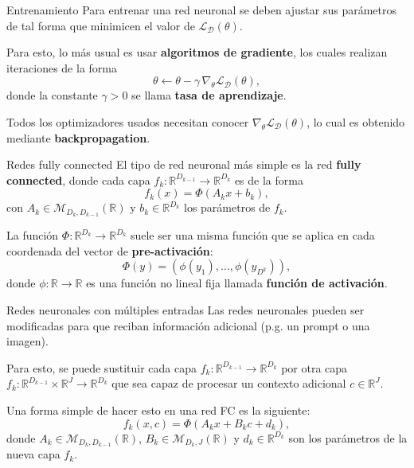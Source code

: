 \documentclass{beamer}
\newcommand{\R}{\mathbb{R}}
\begin{document}
\begin{frame}{Entrenamiento}
    Para entrenar una red neuronal se deben ajustar sus parámetros de tal forma que minimicen el valor de $\mathcal{L}_\mathcal{D}\left(\theta\right)$.

    Para esto, lo más usual es usar \textbf{algoritmos de gradiente}, los cuales realizan iteraciones de la forma
    \begin{equation*}
        \theta\leftarrow\theta - \gamma\,\nabla_{\theta} \mathcal{L}_\mathcal{D}\left(\theta\right),
    \end{equation*}
    donde la constante $\gamma>0$ se llama \textbf{tasa de aprendizaje}.

    Todos los optimizadores usados necesitan conocer $\nabla_\theta \mathcal{L}_\mathcal{D}\left(\theta\right)$, lo cual es obtenido mediante \textbf{backpropagation}.
\end{frame}

\begin{frame}{Redes fully connected}
    El tipo de red neuronal más simple es la red \textbf{fully connected}, donde cada capa $f_k:\R^{D_{k-1}}\to\R^{D_k}$ es de la forma
    \begin{equation*}
        f_k(x)=\Phi(A_kx+b_k),
    \end{equation*}
    con $A_k\in\mathcal{M}_{D_k,D_{k-1}}(\R)$ y $b_k\in\R^{D_k}$ los parámetros de $f_k$.

    La función $\Phi:\R^{D_k}\to\R^{D_k}$ suele ser una misma función que se aplica en cada coordenada del vector de \textbf{pre-activación}:
    \begin{equation*}
        \Phi(y)=\left(\phi(y_1),\ldots,\phi(y_{D^k})\right),
    \end{equation*}
    donde $\phi:\R\to\R$ es una función no lineal fija llamada \textbf{función de activación}.
\end{frame}

\begin{frame}{Redes neuronales con múltiples entradas}
    Las redes neuronales pueden ser modificadas para que reciban información adicional (p.g. un prompt o una imagen).

    Para esto, se puede sustituir cada capa $f_k:\R^{D_{k-1}}\to\R^{D_k}$ por otra capa $f_k:\R^{D_{k-1}}\times\R^J\to\R^{D_k}$ que sea capaz de procesar un contexto adicional $c\in\R^J$.

    Una forma simple de hacer esto en una red FC es la siguiente:
    \begin{equation*}
        f_k(x,c)=\Phi(A_kx+B_kc+d_k),
    \end{equation*}
    donde $A_k\in\mathcal{M}_{D_k,D_{k-1}}(\R)$, $B_k\in\mathcal{M}_{D_k,J}(\R)$ y $d_k\in\R^{D_k}$ son los parámetros de la nueva capa $f_k$.
\end{frame}
\end{document}

